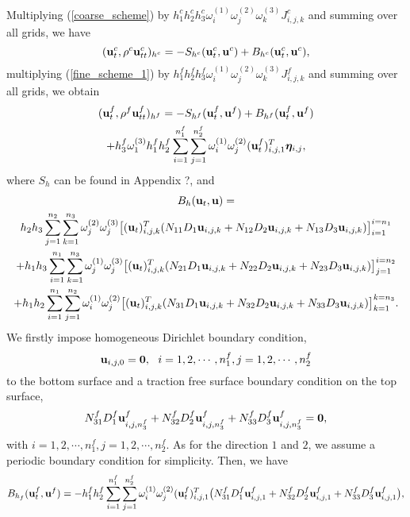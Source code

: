 \documentclass[a4paper]{article}
\begin{document}
Multiplying (\ref{coarse_scheme}) by $h_1^ch_2^ch_3^c\omega_i^{(1)}\omega_j^{(2)}\omega_k^{(3)}J_{i,j,k}^c$ and summing over all grids, we have
\begin{equation}\label{coarse_simple}
({\bf u}_t^c, \rho^c{\bf u}_{tt}^c)_{h^c} = -S_{h^c}({\bf u}_t^c,{\bf u}^c) + B_{h^c}({\bf u}_t^c,{\bf u}^c),
\end{equation}
multiplying (\ref{fine_scheme_1}) by $h_1^fh_2^fh_3^f\omega_i^{(1)}\omega_j^{(2)}\omega_k^{(3)}J_{i,j,k}^f$ and summing over all grids, we obtain
\begin{multline}\label{fine_simple}
({\bf u}_t^f, \rho^f{\bf u}_{tt}^f)_{h^f} = -S_{h^f}({\bf u}_t^f,{\bf u}^f) + B_{h^f}({\bf u}_t^f,{\bf u}^f) \\
+h_3^f\omega_1^{(3)}h_1^fh_2^f\sum_{i=1}^{n_1^f}\sum_{j=1}^{n_2^f}\omega_i^{(1)}\omega_j^{(2)}({\bf u}_t^f)_{i,j,1}^{T}{\bm \eta}_{i,j},
\end{multline}
where  $S_h$ can be found in Appendix ?, and 
\begin{multline*}
B_h({\bf u}_t, {\bf u}) = \\
h_2h_3\sum_{j=1}^{n_2}\sum_{k=1}^{n_3}\omega_j^{(2)}\omega_j^{(3)}\big[({\bf u}_t)_{i,j,k}^{T}(N_{11}D_1{\bf u}_{i,j,k} + N_{12}D_2{\bf u}_{i,j,k} +N_{13}D_3{\bf u}_{i,j,k})\big]_{i=1}^{i=n_1}\\
+h_1h_3\sum_{i=1}^{n_1}\sum_{k=1}^{n_3}\omega_j^{(1)}\omega_j^{(3)}\big[({\bf u}_t)_{i,j,k}^{T}(N_{21}D_1{\bf u}_{i,j,k} + N_{22}D_2{\bf u}_{i,j,k} +N_{23}D_3{\bf u}_{i,j,k})\big]_{j=1}^{i=n_2}\\
+h_1h_2\sum_{i=1}^{n_1}\sum_{j=1}^{n_2}\omega_i^{(1)}\omega_j^{(2)}\big[({\bf u}_t)_{i,j,k}^{T}(N_{31}D_1{\bf u}_{i,j,k} + N_{32}D_2{\bf u}_{i,j,k} +N_{33}D_3{\bf u}_{i,j,k})\big]_{k=1}^{k=n_3}.
\end{multline*}
 We firstly impose homogeneous Dirichlet boundary condition,
\begin{equation*}
{\bf u}_{i,j,0} = {\bf 0},\ \ i = 1,2,\cdots,n_1^f, j = 1,2,\cdots,n_2^f 
\end{equation*}
to the bottom surface and a traction free surface boundary condition on the top surface,
\begin{equation*}
N_{31}^fD_1^f{\bf u}_{i,j,n_3^f}^f + N_{32}^fD_2^f{\bf u}_{i,j,n_3^f}^f +N_{33}^fD_3^f{\bf u}_{i,j,n_3^f}^f= {\bf 0}, 
\end{equation*}
with $i = 1,2,\cdots,n_1^f, j = 1,2,\cdots,n_2^f$. As for the direction $1$ and $2$, we assume a periodic boundary condition for simplicity. Then, we have
\begin{equation}\label{boundary_f}
B_{h_f} ({\bf u}_t^f,{\bf u}^f) = -h_1^fh_2^f\sum_{i = 1}^{n_1^f}\sum_{j=1}^{n_2^f}\omega_i^{(1)}\omega_j^{(2)}({\bf u}_t^f)^T_{i,j,1}\big(N_{31}^fD_1^f {\bf u}^f_{i,j,1}+ N_{32}^fD_2^f{\bf u}^f_{i,j,1}+N_{33}^fD_3^f{\bf u}^f_{i,j,1}\big),
\end{equation}
\end{document}
